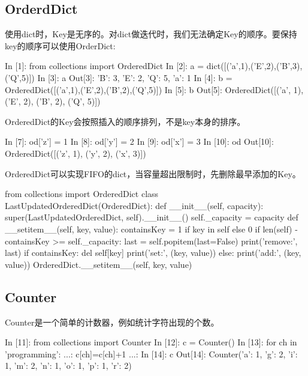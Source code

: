 \subsection{OrderdDict}
使用dict时，Key是无序的。对dict做迭代时，我们无法确定Key的顺序。要保持key的顺序可以使用OrderDict:
\begin{python}
In [1]: from collections import OrderedDict
In [2]: a = dict([('a',1),('E',2),('B',3),('Q',5)])
In [3]: a
Out[3]: {'B': 3, 'E': 2, 'Q': 5, 'a': 1}
In [4]: b = OrderedDict([('a',1),('E',2),('B',2),('Q',5)])
In [5]: b
Out[5]: OrderedDict([('a', 1), ('E', 2), ('B', 2), ('Q', 5)])
\end{python}
OrderedDict的Key会按照插入的顺序排列，不是key本身的排序。
\begin{python}
In [7]: od['z'] = 1
In [8]: od['y'] = 2
In [9]: od['x'] = 3
In [10]: od
Out[10]: OrderedDict([('z', 1), ('y', 2), ('x', 3)])
\end{python}
OrderedDict可以实现FIFO的dict，当容量超出限制时，先删除最早添加的Key。
\begin{python}
from collections import OrderedDict
class LastUpdatedOrderedDict(OrderedDict):
    def __init__(self, capacity):
        super(LastUpdatedOrderedDict, self).__init__()
        self._capacity = capacity
    def __setitem__(self, key, value):
        containsKey = 1 if key in self else 0
        if len(self) - containsKey >= self._capacity:
            last = self.popitem(last=False)
            print('remove:', last)
        if containsKey:
            del self[key]
            print('set:', (key, value))
        else:
            print('add:', (key, value))
            OrderedDict.__setitem__(self, key, value)
\end{python}
\subsection{Counter}
Counter是一个简单的计数器，例如统计字符出现的个数。
\begin{python}
In [11]: from collections import Counter
In [12]: c = Counter()
In [13]: for ch in 'programming':
...:     c[ch]=c[ch]+1
...:     
In [14]: c
Out[14]: Counter({'a': 1, 'g': 2, 'i': 1, 'm': 2, 'n': 1, 'o': 1, 'p': 1, 'r': 2})
\end{python}
